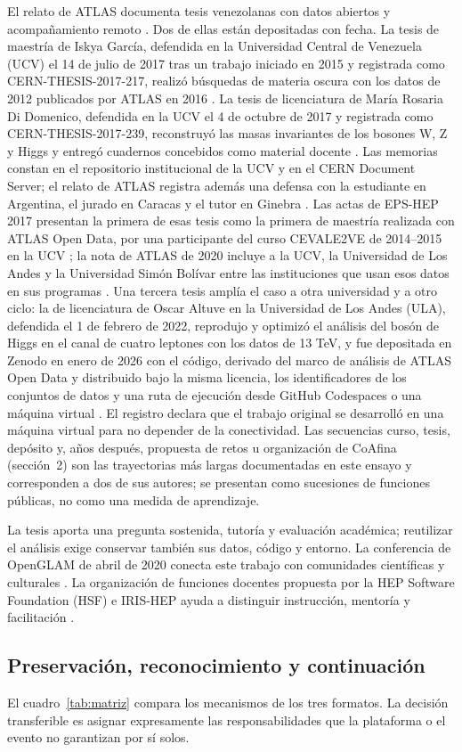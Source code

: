 El relato de ATLAS documenta tesis venezolanas con datos abiertos y acompañamiento remoto \cite{atlas}. Dos de ellas están depositadas con fecha. La tesis de maestría de Iskya García, defendida en la Universidad Central de Venezuela (UCV) el 14 de julio de 2017 tras un trabajo iniciado en 2015 y registrada como CERN-THESIS-2017-217, realizó búsquedas de materia oscura con los datos de 2012 publicados por ATLAS en 2016 \cite{tesisgarcia}. La tesis de licenciatura de María Rosaria Di Domenico, defendida en la UCV el 4 de octubre de 2017 y registrada como CERN-THESIS-2017-239, reconstruyó las masas invariantes de los bosones W, Z y Higgs y entregó cuadernos concebidos como material docente \cite{tesisdidomenico}. Las memorias constan en el repositorio institucional de la UCV y en el CERN Document Server; el relato de ATLAS registra además una defensa con la estudiante en Argentina, el jurado en Caracas y el tutor en Ginebra \cite{atlas}. Las actas de EPS-HEP 2017 presentan la primera de esas tesis como la primera de maestría realizada con ATLAS Open Data, por una participante del curso CEVALE2VE de 2014--2015 en la UCV \cite{cevale2ve}; la nota de ATLAS de 2020 incluye a la UCV, la Universidad de Los Andes y la Universidad Simón Bolívar entre las instituciones que usan esos datos en sus programas \cite{atlas13tev}. Una tercera tesis amplía el caso a otra universidad y a otro ciclo: la de licenciatura de Oscar Altuve en la Universidad de Los Andes (ULA), defendida el 1 de febrero de 2022, reprodujo y optimizó el análisis del bosón de Higgs en el canal de cuatro leptones con los datos de 13 TeV, y fue depositada en Zenodo en enero de 2026 con el código, derivado del marco de análisis de ATLAS Open Data y distribuido bajo la misma licencia, los identificadores de los conjuntos de datos y una ruta de ejecución desde GitHub Codespaces o una máquina virtual \cite{tesisaltuve}. El registro declara que el trabajo original se desarrolló en una máquina virtual para no depender de la conectividad. Las secuencias curso, tesis, depósito y, años después, propuesta de retos u organización de CoAfina (sección~2) son las trayectorias más largas documentadas en este ensayo y corresponden a dos de sus autores; se presentan como sucesiones de funciones públicas, no como una medida de aprendizaje.

La tesis aporta una pregunta sostenida, tutoría y evaluación académica; reutilizar el análisis exige conservar también sus datos, código y entorno. La conferencia de OpenGLAM de abril de 2020 conecta este trabajo con comunidades científicas y culturales \cite{openglam}. La organización de funciones docentes propuesta por la HEP Software Foundation (HSF) e IRIS-HEP ayuda a distinguir instrucción, mentoría y facilitación \cite{hsftraining}.

\subsection{Preservación, reconocimiento y continuación}
El cuadro~\ref{tab:matriz} compara los mecanismos de los tres formatos. La decisión transferible es asignar expresamente las responsabilidades que la plataforma o el evento no garantizan por sí solos.

